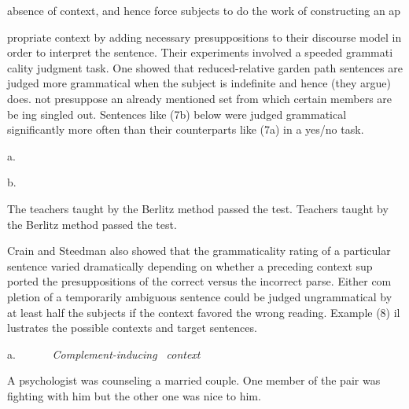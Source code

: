 \begin{styleTextbody}
absence of context, and hence force subjects to do the work of constructing an ap\-
\end{styleTextbody}


\begin{styleTextbody}
propriate context by adding necessary presuppositions to their discourse model in order to interpret the sentence. Their experiments involved a speeded grammati\- cality judgment task. One showed that reduced-relative garden path sentences are judged more grammatical when the subject is indefinite and hence (they argue) does. not presuppose an already mentioned set from which certain members are be\- ing singled out. Sentences like (7b) below were judged grammatical significantly more often than their counterparts like (7a) in a yes/no task.
\end{styleTextbody}


\begin{multicols}{2}
\setcounter{listWWNumxxixleveli}{6}
\begin{listWWNumxxixleveli}
\item 
\begin{styleTextbody}
a.
\end{styleTextbody}


\end{listWWNumxxixleveli}
\begin{styleStandard}
b.
\end{styleStandard}


\begin{styleTextbody}
The teachers taught by the Berlitz method passed the test. Teachers taught by the Berlitz method passed the test.
\end{styleTextbody}


\end{multicols}
\begin{styleTextbody}
Crain and Steedman also showed that the grammaticality rating of a particular sentence varied dramatically depending on whether a preceding context sup\- ported the presuppositions of the correct versus the incorrect parse. Either com\- pletion of a temporarily ambiguous sentence could be judged ungrammatical by at least half the subjects if the context favored the wrong reading. Example (8) il\- lustrates the possible contexts and target sentences.
\end{styleTextbody}


\begin{listWWNumxxixleveli}
\item 
\begin{styleStandard}
a. \ \ \ \ \ \ \textit{Complement-inducing }\textit{\ }\textit{context}
\end{styleStandard}


\end{listWWNumxxixleveli}
\begin{styleTextbody}
A psychologist was counseling a married couple. One member of the pair was fighting with him but the other one was nice to him.
\end{styleTextbody}


